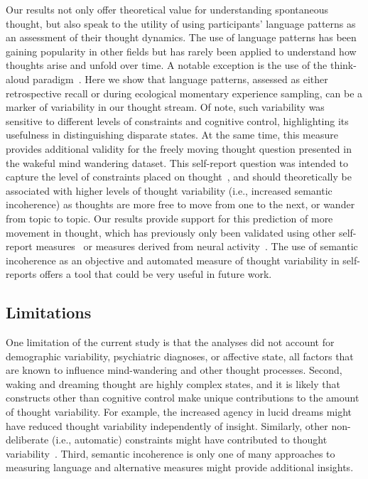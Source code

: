 \documentclass[10pt,a4paper,twocolumn]{article}
\begin{document}
\par
Our results not only offer theoretical value for understanding spontaneous thought, but also speak to the utility of using participants' language patterns as an assessment of their thought dynamics. The use of language patterns has been gaining popularity in other fields but has rarely been applied to understand how thoughts arise and unfold over time. A notable exception is the use of the think-aloud paradigm~\cite{raffaelli2021,sripada2020}. Here we show that language patterns, assessed as either retrospective recall or during ecological momentary experience sampling, can be a marker of variability in our thought stream. Of note, such variability was sensitive to different levels of constraints and cognitive control, highlighting its usefulness in distinguishing disparate states. At the same time, this measure provides additional validity for the freely moving thought question presented in the wakeful mind wandering dataset. This self-report question was intended to capture the level of constraints placed on thought~\cite{mills2021}, and should theoretically be associated with higher levels of thought variability (i.e., increased semantic incoherence) as thoughts are more free to move from one to the next, or wander from topic to topic. Our results provide support for this prediction of more movement in thought, which has previously only been validated using other self-report measures~\cite{mills2021} or measures derived from neural activity~\cite{kam2021}. The use of semantic incoherence as an objective and automated measure of thought variability in self-reports offers a tool that could be very useful in future work.

\subsection*{Limitations}

One limitation of the current study is that the analyses did not account for demographic variability, psychiatric diagnoses, or affective state, all factors that are known to influence mind-wandering and other thought processes. Second, waking and dreaming thought are highly complex states, and it is likely that constructs other than cognitive control make unique contributions to the amount of thought variability. For example, the increased agency in lucid dreams might have reduced thought variability independently of insight. Similarly, other non-deliberate (i.e., automatic) constraints might have contributed to thought variability~\cite{christoff2016}. Third, semantic incoherence is only one of many approaches to measuring language and alternative measures might provide additional insights.
\end{document}

